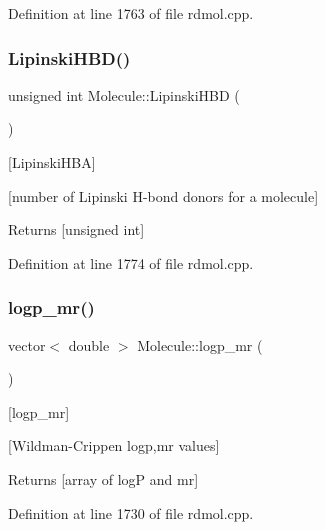 Definition at line 1763 of file rdmol.\+cpp.

\mbox{\label{class_molecule_a5b22fcdafd01813f7a554f42dad03aea}} 
\subsubsection{\texorpdfstring{Lipinski\+H\+B\+D()}{LipinskiHBD()}}
{\footnotesize\ttfamily unsigned int Molecule\+::\+Lipinski\+H\+BD (\begin{DoxyParamCaption}{ }\end{DoxyParamCaption})}



\mbox{[}Lipinski\+H\+BA\mbox{]} 

\mbox{[}number of Lipinski H-\/bond donors for a molecule\mbox{]}

\begin{DoxyReturn}{Returns}
\mbox{[}unsigned int\mbox{]} 
\end{DoxyReturn}


Definition at line 1774 of file rdmol.\+cpp.

\mbox{\label{class_molecule_ae3e5569d45cb96dbf1636d55e69273d4}} 
\subsubsection{\texorpdfstring{logp\+\_\+mr()}{logp\_mr()}}
{\footnotesize\ttfamily vector$<$ double $>$ Molecule\+::logp\+\_\+mr (\begin{DoxyParamCaption}{ }\end{DoxyParamCaption})}



\mbox{[}logp\+\_\+mr\mbox{]} 

\mbox{[}Wildman-\/\+Crippen logp,mr values\mbox{]} \begin{DoxyReturn}{Returns}
\mbox{[}array of logP and mr\mbox{]} 
\end{DoxyReturn}


Definition at line 1730 of file rdmol.\+cpp.

\mbox{\label{class_molecule_a5e441ebbeef50a379ed79911805a5124}} 
